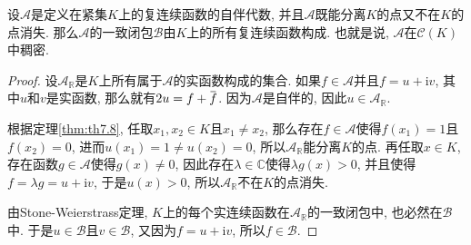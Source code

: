 \documentclass[cn,12pt,math=mtpro2,citestyle=gb7714-2015,bibstyle=gb7714-2015,twocol]{elegantbook}
\newcommand{\R}{\mathbb{R}}
\newcommand{\overbar}[1]{\mkern 1.5mu\overline{\mkern-1.5mu#1\mkern-1.5mu}\mkern 1.5mu}
\begin{document}
\begin{theorem}\label{thm:th7.10}
  设$\mathscr{A}$是定义在紧集$K$上的复连续函数的自伴代数, 并且$\mathscr{A}$既能分离$K$的点又不在$K$的点消失. 那么$\mathscr{A}$的一致闭包$\mathscr{B}$由$K$上的所有复连续函数构成. 也就是说, $\mathscr{A}$在$\mathscr{C}(K)$中稠密.
\end{theorem}
\begin{proof}
  设$\mathscr{A}_{\R}$是$K$上所有属于$\mathscr{A}$的实函数构成的集合. 如果$f\in\mathscr{A}$并且$f=u+\text{i}v$, 其中$u$和$v$是实函数, 那么就有$2u=f+\overbar{f}$. 因为$\mathscr{A}$是自伴的, 因此$u\in\mathscr{A}_{\R}$.

  根据定理\ref{thm:th7.8}, 任取$x_1,x_2\in K$且$x_1\neq x_2$, 那么存在$f\in\mathscr{A}$使得$f(x_1)=1$且$f(x_2)=0$, 进而$u(x_1)=1\neq u(x_2)=0$, 所以$\mathscr{A} _{\R}$能分离$K$的点. 再任取$x\in K$, 存在函数$g\in\mathscr{A}$使得$g(x)\neq 0$, 因此存在$\lambda\in\mathbb{C}$使得$\lambda g(x)>0$, 并且使得$f=\lambda g=u+\text{i}v$, 于是$u(x)>0$, 所以$\mathscr{A}_{\R}$不在$K$的点消失.

  由Stone-Weierstrass定理, $K$上的每个实连续函数在$\mathscr{A}_{\R}$的一致闭包中, 也必然在$\mathscr{B}$中. 于是$u\in\mathscr{B}$且$v\in\mathscr{B}$, 又因为$f=u+\text{i}v$, 所以$f\in\mathscr{B}$.


\end{proof}
\end{document}

